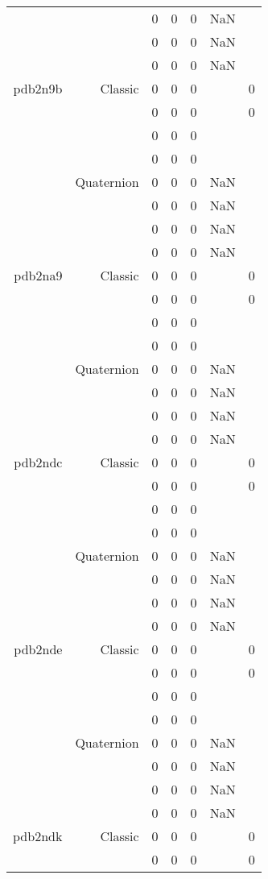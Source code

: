 \begin{xltabular}{\textwidth}{r|rcccSc}
& & 0 & 0 & 0 & NaN & \\
& & 0 & 0 & 0 & NaN & \\
& & 0 & 0 & 0 & NaN & \\ \addlinespace
pdb2n9b & Classic & 0 & 0 & 0 & & 0 \\
& & 0 & 0 & 0 & & 0 \\
& & 0 & 0 & 0 & & \\
& & 0 & 0 & 0 & & \\
& Quaternion & 0 & 0 & 0 & NaN & \\
& & 0 & 0 & 0 & NaN & \\
& & 0 & 0 & 0 & NaN & \\
& & 0 & 0 & 0 & NaN & \\ \addlinespace
pdb2na9 & Classic & 0 & 0 & 0 & & 0 \\
& & 0 & 0 & 0 & & 0 \\
& & 0 & 0 & 0 & & \\
& & 0 & 0 & 0 & & \\
& Quaternion & 0 & 0 & 0 & NaN & \\
& & 0 & 0 & 0 & NaN & \\
& & 0 & 0 & 0 & NaN & \\
& & 0 & 0 & 0 & NaN & \\ \addlinespace
pdb2ndc & Classic & 0 & 0 & 0 & & 0 \\
& & 0 & 0 & 0 & & 0 \\
& & 0 & 0 & 0 & & \\
& & 0 & 0 & 0 & & \\
& Quaternion & 0 & 0 & 0 & NaN & \\
& & 0 & 0 & 0 & NaN & \\
& & 0 & 0 & 0 & NaN & \\
& & 0 & 0 & 0 & NaN & \\ \addlinespace
pdb2nde & Classic & 0 & 0 & 0 & & 0 \\
& & 0 & 0 & 0 & & 0 \\
& & 0 & 0 & 0 & & \\
& & 0 & 0 & 0 & & \\
& Quaternion & 0 & 0 & 0 & NaN & \\
& & 0 & 0 & 0 & NaN & \\
& & 0 & 0 & 0 & NaN & \\
& & 0 & 0 & 0 & NaN & \\ \addlinespace
pdb2ndk & Classic & 0 & 0 & 0 & & 0 \\
& & 0 & 0 & 0 & & 0 \\

\end{xltabular}
